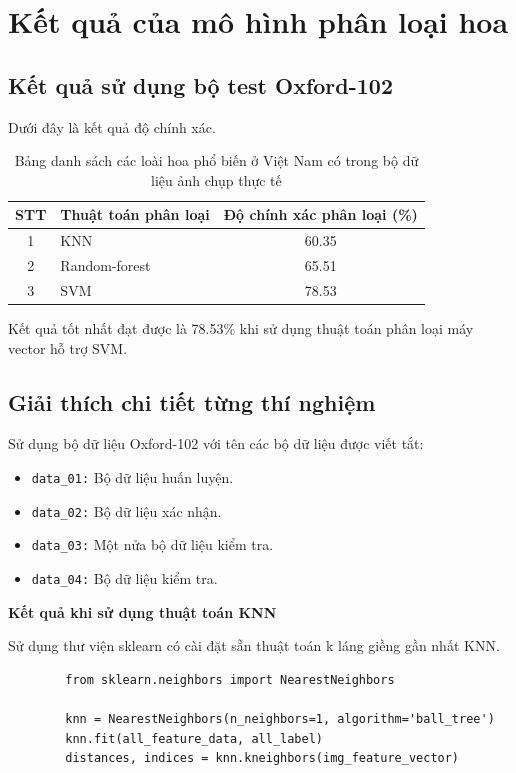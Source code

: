 \documentclass[12pt]{report}
\begin{document}
				
				
		\section{Kết quả của mô hình phân loại hoa}
		\subsection{Kết quả sử dụng bộ test Oxford-102}
		Dưới đây là kết quả độ chính xác.
				
		\begin{table}[h]
			\centering
			\caption{Bảng danh sách các loài hoa phổ biến ở Việt Nam có trong bộ dữ liệu ảnh chụp thực tế}
			\label{tbl:table ket qua phan loai hoa}
			\begin{tabular}{|c|l|c|}
				\hline
				\textbf{STT} & \textbf{Thuật toán phân loại} & \textbf{Độ chính xác phân loại (\%)} \\ \hline
				1            & KNN                                 & 60.35                                        \\ \hline
				2            & Random-forest                       & 65.51                                        \\ \hline
				3            & SVM                                 & 78.53                                        \\ \hline
			\end{tabular}
		\end{table}
		Kết quả tốt nhất đạt được là 78.53\% khi sử dụng thuật toán phân loại máy vector hỗ trợ SVM.
				
		\subsection{Giải thích chi tiết từng thí nghiệm}
		Sử dụng bộ dữ liệu Oxford-102 với tên các bộ dữ liệu được viết tắt:
		\begin{itemize}
			\item \texttt{data\_01:} Bộ dữ liệu huấn luyện.
			\item \texttt{data\_02:} Bộ dữ liệu xác nhận.
			\item \texttt{data\_03:} Một nửa bộ dữ liệu kiểm tra.
			\item \texttt{data\_04:} Bộ dữ liệu kiểm tra.
		\end{itemize}
				
		\textbf{Kết quả khi sử dụng thuật toán KNN}
						
		Sử dụng thư viện sklearn có cài đặt sẵn thuật toán k láng giềng gần nhất KNN.
		\begin{lstlisting}
		from sklearn.neighbors import NearestNeighbors

		knn = NearestNeighbors(n_neighbors=1, algorithm='ball_tree')
		knn.fit(all_feature_data, all_label)
		distances, indices = knn.kneighbors(img_feature_vector)
		\end{lstlisting}
				
\end{document}
